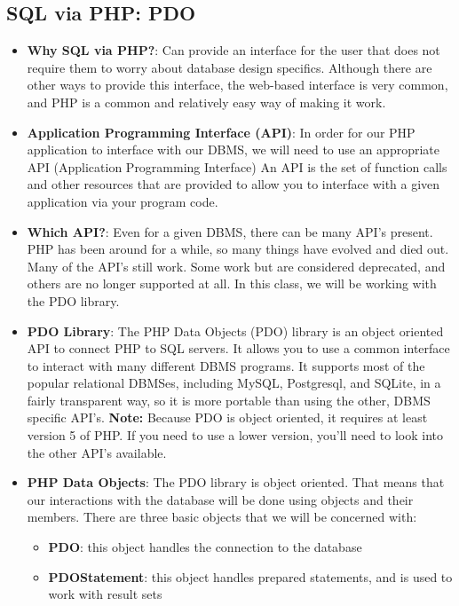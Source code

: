 \documentclass{report}
\begin{document}
    \pagebreak 
    \subsection{SQL via PHP: PDO}
    \begin{itemize}
        \item \textbf{Why SQL via PHP?}: Can provide an interface for the user that does not require them to worry about database design specifics.
            \bigbreak \noindent 
            Although there are other ways to provide this interface, the web-based interface is very common, and PHP is a common and relatively easy way of making it work.
        \item \textbf{Application Programming Interface (API)}: In order for our PHP application to interface with our DBMS, we will need to use an appropriate API (Application Programming Interface) An API is the set of function calls and other resources that are provided to allow you to interface with a given application via your program code.
        \item \textbf{Which API?}: Even for a given DBMS, there can be many API’s present. PHP has been around for a while, so many things have evolved and died out. Many of the API’s still work. Some work but are considered deprecated, and others are no longer supported at all. In this class, we will be working with the PDO library.
        \item \textbf{PDO Library}: The PHP Data Objects (PDO) library is an object oriented API to connect PHP to SQL servers. It allows you to use a common interface to interact with many different DBMS programs.
            \bigbreak \noindent 
            It supports most of the popular relational DBMSes, including MySQL, Postgresql, and SQLite, in a fairly transparent way, so it is more portable than using the other, DBMS specific API’s.
            \textbf{Note:} Because PDO is object oriented, it requires at least version 5 of PHP. If you need to use a lower version, you’ll need to look into the other API’s available.
        \item \textbf{PHP Data Objects}: The PDO library is object oriented. That means that our interactions with the database will be done using objects and their members. There are three basic objects that we will be concerned with:
            \begin{itemize}
                \item \textbf{PDO}: this object handles the connection to the database
                \item \textbf{PDOStatement}: this object handles prepared statements, and is used to work with result sets

\end{itemize}
\end{itemize}
\end{document}
